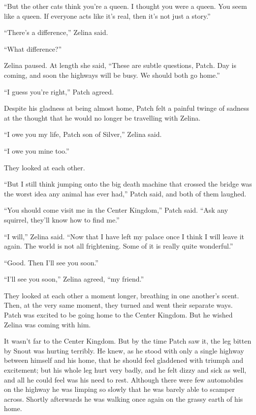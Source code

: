 \documentclass[ebook,oneside,openany,17pt]{memoir}
\newenvironment{tolerant}[1]{%
  \par\tolerance=#1\relax
}{%
  \par
}
\begin{document}
\begin{tolerant}{5000}
“But the other cats think you’re a queen. I thought you were a
queen. You seem like a queen. If everyone acts like it’s real, then
it’s not just a story.”
\end{tolerant}

“There’s a difference,” Zelina said.

“What difference?”

Zelina paused. At length she said, “These are subtle questions,
Patch. Day is coming, and soon the highways will be busy. We should
both go home.”

“I guess you’re right,” Patch agreed.

Despite his gladness at being almost home, Patch felt a painful twinge
of sadness at the thought that he would no longer be travelling with
Zelina.

“I owe you my life, Patch son of Silver,” Zelina said.

“I owe you mine too.”

They looked at each other.

“But I still think jumping onto the big death machine that crossed the
bridge was the worst idea any animal has ever had,” Patch said, and
both of them laughed.

“You should come visit me in the Center Kingdom,” Patch said. “Ask any
squirrel, they’ll know how to find me.”

“I will,” Zelina said. “Now that I have left my palace once I think I
will leave it again. The world is not all frightening. Some of it is
really quite wonderful.”

“Good. Then I’ll see you soon.”

“I’ll see you soon,” Zelina agreed, “my friend.”

\begin{tolerant}{1000}
They looked at each other a moment longer, breathing in one another’s
scent. Then, at the very same moment, they turned and went their
separate ways. Patch was excited to be going home to the Center
Kingdom. But he wished Zelina was coming with him.
\end{tolerant}

It wasn’t far to the Center Kingdom. But by the time Patch saw it, the
leg bitten by Snout was hurting terribly. He knew, as he stood with
only a single highway between himself and his home, that he should
feel gladdened with triumph and excitement; but his whole leg hurt
very badly, and he felt dizzy and sick as well, and all he could feel
was his need to rest. Although there were few automobiles on the
highway he was limping so slowly that he was barely able to scamper
across. Shortly afterwards he was walking once again on the grassy
earth of his home.
\end{document}
